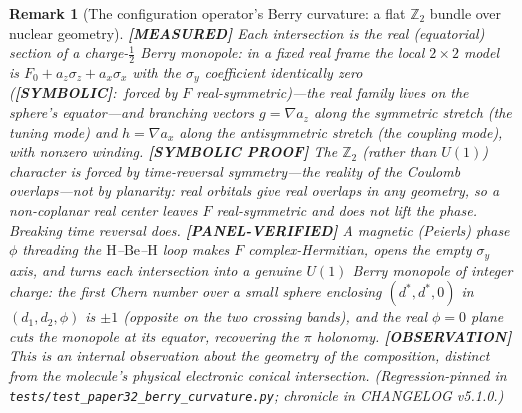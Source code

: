 \documentclass[11pt]{article}
\newtheorem{remark}{Remark}
\begin{document}
\begin{remark}[The configuration operator's Berry curvature: a flat $\mathbb{Z}_2$ bundle over nuclear geometry]
\textbf{[MEASURED]} Each intersection is the real (equatorial) section of a charge-$\tfrac12$
Berry monopole: in a fixed real frame the local $2\times2$ model is
$F_0 + a_z \sigma_z + a_x \sigma_x$ with the $\sigma_y$ coefficient
\emph{identically zero} (\textbf{[SYMBOLIC]}:\ forced by $F$ real-symmetric)---the real family lives on the sphere's equator---and
branching vectors $g = \nabla a_z$ along the symmetric stretch (the tuning
mode) and $h = \nabla a_x$ along the antisymmetric stretch (the coupling
mode), with nonzero winding.  \textbf{[SYMBOLIC PROOF]} The $\mathbb{Z}_2$ (rather than $U(1)$)
character is \emph{forced by time-reversal symmetry}---the reality of the
Coulomb overlaps---not by planarity: real orbitals give real overlaps in any
geometry, so a non-coplanar real center leaves $F$ real-symmetric and does not
lift the phase.  Breaking time reversal does.  \textbf{[PANEL-VERIFIED]} A magnetic (Peierls) phase
$\phi$ threading the $\mathrm{H}$--$\mathrm{Be}$--$\mathrm{H}$ loop makes $F$
complex-Hermitian, opens the empty $\sigma_y$ axis, and turns each intersection
into a genuine $U(1)$ Berry monopole of integer charge: the first Chern number
over a small sphere enclosing $(d^*, d^*, 0)$ in $(d_1, d_2, \phi)$ is $\pm1$
(opposite on the two crossing bands), and the real $\phi = 0$ plane cuts the
monopole at its equator, recovering the $\pi$ holonomy.
\textbf{[OBSERVATION]} This is an internal
observation about the geometry of the composition, distinct from the
molecule's physical electronic conical intersection.  (Regression-pinned in
\texttt{tests/test\_paper32\_berry\_curvature.py}; chronicle in CHANGELOG
v5.1.0.)
\end{remark}
\end{document}
